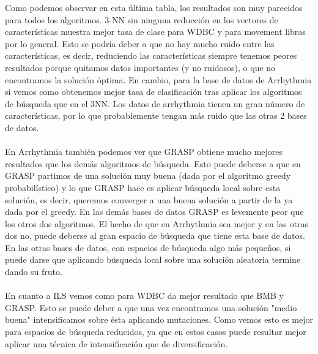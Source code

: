 Como podemos observar en esta última tabla, los resultados son muy parecidos para todos los algoritmos. 3-NN sin ninguna reducción en los vectores de características muestra mejor tasa de clase para WDBC y para movement libras por lo general. Esto se podría deber a que no hay mucho ruido entre las características, es decir, reduciendo las características siempre tenemos peores resultados porque quitamos datos importantes (y no ruidosos), o que no encontramos la solución óptima. En cambio, para la base de datos de Arrhythmia si vemos como obtenemos mejor tasa de clasificación tras aplicar los algoritmos de búsqueda que en el 3NN. Los datos de arrhythmia tienen un gran número de características, por lo que probablemente tengan más ruido que las otras 2 bases de datos.
\\
\\
En Arrhythmia también podemos ver que GRASP obtiene mucho mejores resultados que los demás algoritmos de búsqueda. Esto puede deberse a que en GRASP partimos de una solución muy buena (dada por el algoritmo greedy probabilístico) y lo que GRASP hace es aplicar búsqueda local sobre esta solución, es decir, queremos converger a una buena solución a partir de la ya dada por el greedy. En las demás bases de datos GRASP es levemente peor que los otros dos algoritmos. El hecho de que en Arrhythmia sea mejor y en las otras dos no, puede deberse al gran espacio de búsqueda que tiene esta base de datos. En las otras bases de datos, con espacios de búsqueda algo más pequeños, si puede darse que aplicando búsqueda local sobre una solución aleatoria termine dando su fruto.
\\
\\
En cuanto a ILS vemos como para WDBC da mejor resultado que BMB y GRASP. Esto se puede deber a que una vez encontramos una solución "medio buena" intensificamos sobre ésta aplicando mutaciones. Como vemos esto es mejor para espacios de búsqueda reducidos, ya que en estos casos puede resultar mejor aplicar una técnica de intensificación que de diversificación.
\\
\\
